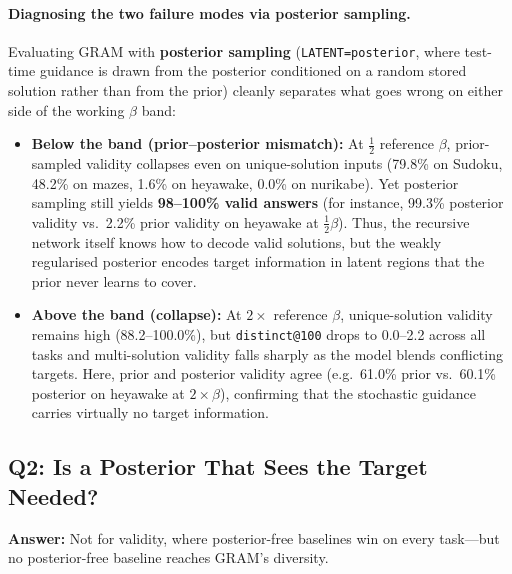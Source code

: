 \documentclass[11pt]{article}
\begin{document}
\paragraph{Diagnosing the two failure modes via posterior sampling.}
Evaluating GRAM with \textbf{posterior sampling} (\texttt{LATENT=posterior}, where test-time guidance is drawn from the posterior conditioned on a random stored solution rather than from the prior) cleanly separates what goes wrong on either side of the working $\beta$ band:
\begin{itemize}
  \item \textbf{Below the band (prior--posterior mismatch):} At $\frac{1}{2}$ reference $\beta$, prior-sampled validity collapses even on unique-solution inputs (79.8\% on Sudoku, 48.2\% on mazes, 1.6\% on heyawake, 0.0\% on nurikabe). Yet posterior sampling still yields \textbf{98--100\% valid answers} (for instance, 99.3\% posterior validity vs.\ 2.2\% prior validity on heyawake at $\frac{1}{2}\beta$). Thus, the recursive network itself knows how to decode valid solutions, but the weakly regularised posterior encodes target information in latent regions that the prior never learns to cover.
  \item \textbf{Above the band (collapse):} At $2\times$ reference $\beta$, unique-solution validity remains high (88.2--100.0\%), but \texttt{distinct@100} drops to 0.0--2.2 across all tasks and multi-solution validity falls sharply as the model blends conflicting targets. Here, prior and posterior validity agree (e.g.\ 61.0\% prior vs.\ 60.1\% posterior on heyawake at $2\times\beta$), confirming that the stochastic guidance carries virtually no target information.
\end{itemize}

\subsection{Q2: Is a Posterior That Sees the Target Needed?}
\textbf{Answer:} Not for validity, where posterior-free baselines win on every task---but no posterior-free baseline reaches GRAM's diversity.
\end{document}
